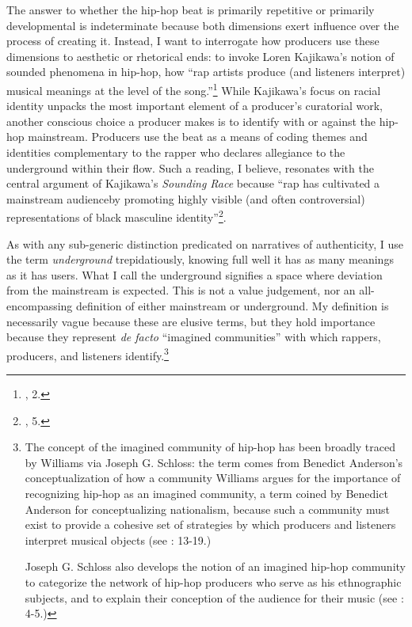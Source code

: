 The answer to whether the hip-hop beat is primarily repetitive or primarily developmental is indeterminate because both dimensions exert influence over the process of creating it. Instead, I want to interrogate how producers use these dimensions to aesthetic or rhetorical ends: to invoke Loren Kajikawa's notion of sounded phenomena in hip-hop, how ``rap artists produce (and listeners interpret) musical meanings at the level of the song.''\footnote{\cite{lorenkajikawaSoundingRaceRap2015}, 2.} While Kajikawa's focus on racial identity unpacks the most important element of a producer's  curatorial work, another conscious choice a producer makes is to identify with or against the hip-hop mainstream. Producers use the beat as a means of coding themes and identities complementary to the rapper who declares allegiance to the underground within their flow. Such a reading, I believe, resonates with the central argument of Kajikawa's \textit{Sounding Race} because ``rap has cultivated a mainstream audience\textellipsis by promoting highly visible (and often controversial) representations of black masculine identity''\footnote{\cite{lorenkajikawaSoundingRaceRap2015}, 5.}.

As with any sub-generic distinction predicated on narratives of authenticity, I use the term \emph{underground} trepidatiously, knowing full well it has as many meanings as it has users. What I call the underground signifies a space where deviation from the mainstream is expected. This is not a value judgement, nor an all-encompassing definition of either mainstream or underground. My definition is necessarily vague because these are elusive terms, but they hold importance because they represent \textit{de facto} ``imagined communities'' with which rappers, producers, and listeners identify.\footnote{The concept of the imagined community of hip-hop has been broadly traced by Williams via Joseph G. Schloss: the term comes from Benedict Anderson's conceptualization of how a community 
Williams argues for the importance of recognizing hip-hop as an imagined community, a term coined by Benedict Anderson for conceptualizing nationalism, because such a community must exist to provide a cohesive set of strategies by which producers and listeners interpret musical objects (see \cite{justinawilliamsRhyminStealinMusical2013}: 13-19.) 

Joseph G. Schloss also develops the notion of an imagined hip-hop community to categorize the network of hip-hop producers who serve as his ethnographic subjects, and to explain their conception of the audience for their music (see \cite{josephgschlossMakingBeatsArt2004}: 4-5.)}

